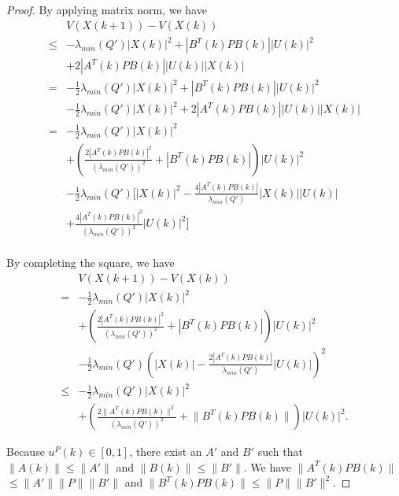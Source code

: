 \documentclass{sig-alternate}
\begin{document}
\begin{proof}
By applying matrix norm, we have
\begin{equation}
\begin{aligned}
& V( X(k+1) ) - V( X(k) ) \\
\leq & - \lambda_{min}(Q') | X(k) |^{2}  + | B^{T}(k) P B(k) | | U(k) |^{2} \\
& + 2  | A^{T}(k) P B(k) | | U(k) | | X(k) | \\
= & - \frac{1}{2} \lambda_{min}(Q') | X(k) |^{2} + | B^{T}(k) P B(k) | | U(k) |^{2} \\
& - \frac{1}{2} \lambda_{min}(Q') | X(k) |^{2} + 2  | A^{T}(k) P B(k) | | U(k) | | X(k) |  \\
= & - \frac{1}{2} \lambda_{min}(Q') | X(k) |^{2} \\
& + \left( \frac{2 | A^{T}(k) P B(k) |^{2}}{ ( \lambda_{min}(Q') )^{2} } + | B^{T}(k) P B(k) |  \right) | U(k) |^{2} \\
& - \frac{1}{2} \lambda_{min}(Q') [ | X(k) |^{2} - \frac{4 | A^{T}(k) P B(k) | }{ \lambda_{min}(Q') }  | X(k) | | U(k) | \\
& + \frac{4 | A^{T}(k) P B(k) |^{2}}{ ( \lambda_{min}(Q') )^{2} } | U(k) |^{2} ] \\
\end{aligned}
\end{equation}
		
By completing the square, we have
\begin{equation}
\label{eq:lyapunov_delta4}
\begin{aligned}
& V( X(k+1) ) - V( X(k) ) \\
= & - \frac{1}{2} \lambda_{min}(Q') | X(k) |^{2} \\
& + \left( \frac{2 | A^{T}(k) P B(k) |^{2}}{ ( \lambda_{min}(Q') )^{2} } + | B^{T}(k) P B(k) | \right) | U(k) |^{2} \\
& - \frac{1}{2} \lambda_{min}(Q') \left( | X(k) | - \frac{2 | A^{T}(k) P B(k) | }{ \lambda_{min}(Q') } | U(k) | \right)^{2} \\
	\leq & - \frac{1}{2} \lambda_{min}(Q') | X(k) |^{2} \\
 &	+ \left( \frac{2 \lVert A^{T}(k) P B(k) \rVert^{2}}{ ( \lambda_{min}(Q') )^{2} } 
	 + \lVert B^{T}(k) P B(k) \rVert \right) | U(k) |^{2}. 
\end{aligned}
\end{equation}
		
Because $ u^{P}(k) \in [0, 1] $, there exist an $ A' $ and $ B' $ such that $ \lVert A(k) \rVert \leq \lVert A' \rVert $ and $ \lVert B(k) \rVert \leq \lVert B' \rVert $.
We have $ \lVert A^{T}(k) P B(k) \rVert $ $  \leq \lVert A' \rVert \lVert P \rVert \lVert B' \rVert $ and $ \lVert B^{T}(k) P B(k) \rVert \leq \lVert P \rVert \lVert B' \rVert^{2} $.
		

\end{proof}
\end{document}
